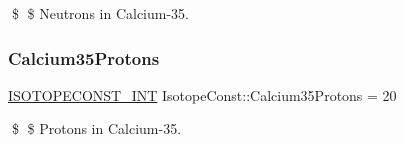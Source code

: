 \$ \$ Neutrons in Calcium-\/35. \mbox{\label{group___isotope_const-_calcium-_ca35_ga4015e280554fd5b15cbd60ff30bd893c}} 
\subsubsection{\texorpdfstring{Calcium35\+Protons}{Calcium35Protons}}
{\footnotesize\ttfamily \mbox{\hyperlink{group___isotope_const-_macros_ga5f18360b3e99483a35c32d789e62621c}{I\+S\+O\+T\+O\+P\+E\+C\+O\+N\+S\+T\+\_\+\+I\+NT}} Isotope\+Const\+::\+Calcium35\+Protons = 20}

\$ \$ Protons in Calcium-\/35. 